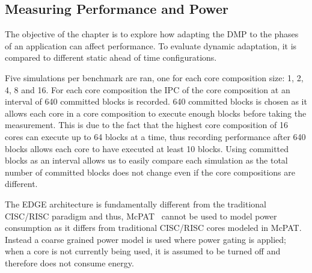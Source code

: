 \subsection{Measuring Performance and Power}

The objective of the chapter is to explore how adapting the DMP to the phases of an application can affect performance.
To evaluate dynamic adaptation, it is compared to different static ahead of time configurations.

Five simulations per benchmark are ran, one for each core composition size: 1, 2, 4, 8 and 16.
For each core composition the IPC of the core composition at an interval of 640 committed blocks is recorded.
640 committed blocks is chosen as it allows each core in a core composition to execute enough blocks before taking the measurement.
This is due to the fact that the highest core composition of 16 cores can execute up to 64 blocks at a time, thus recording performance after 640 blocks allows each core to have executed at least 10 blocks.
Using committed blocks as an interval allows us to easily compare each simulation as the total number of committed blocks does not change even if the core compositions are different.

The EDGE architecture is fundamentally different from the traditional CISC/RISC paradigm and thus, McPAT~\cite{mcpat} cannot be used to model power consumption as it differs from traditional CISC/RISC cores modeled in McPAT.
Instead a coarse grained power model is used where power gating is applied; when a core is not currently being used, it is assumed to be turned off and therefore does not consume energy.